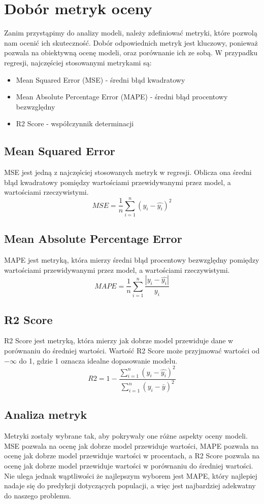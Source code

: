 \documentclass[11pt]{article}
\begin{document}
\section{Dobór metryk oceny}
Zanim przystąpimy do analizy modeli, należy zdefiniować metryki, które pozwolą nam ocenić ich skuteczność.
Dobór odpowiednich metryk jest kluczowy, ponieważ pozwala na obiektywną ocenę modeli, oraz porównanie ich ze sobą.
W przypadku regresji, najczęściej stosowanymi metrykami są:
\begin{itemize}
\item Mean Squared Error (MSE) - średni błąd kwadratowy
\item Mean Absolute Percentage Error (MAPE) - średni błąd procentowy bezwzględny
\item R2 Score - współczynnik determinacji
\end{itemize}
\subsection{Mean Squared Error}
MSE jest jedną z najczęściej stosowanych metryk w regresji. Oblicza ona średni błąd kwadratowy pomiędzy wartościami przewidywanymi przez model, a wartościami rzeczywistymi.
\begin{equation}
MSE = \frac{1}{n} \sum_{i=1}^{n} (y_i - \hat{y_i})^2
\end{equation}
\subsection{Mean Absolute Percentage Error}
MAPE jest metryką, która mierzy średni błąd procentowy bezwzględny pomiędzy wartościami przewidywanymi przez model, a wartościami rzeczywistymi.
\begin{equation}
MAPE = \frac{1}{n} \sum_{i=1}^{n} \frac{|y_i - \hat{y_i}|}{y_i}
\end{equation}
\subsection{R2 Score}
R2 Score jest metryką, która mierzy jak dobrze model przewiduje dane w porównaniu do średniej wartości. Wartość R2 Score może przyjmować wartości od $-\infty$
  do 1, gdzie 1 oznacza idealne dopasowanie modelu.
\begin{equation}
R2 = 1 - \frac{\sum_{i=1}^{n} (y_i - \hat{y_i})^2}{\sum_{i=1}^{n} (y_i - \bar{y})^2}
\end{equation}
\subsection{Analiza metryk}
Metryki zostały wybrane tak, aby pokrywały one różne aspekty oceny modeli. MSE pozwala na ocenę jak dobrze model przewiduje wartości, MAPE pozwala na ocenę jak dobrze model przewiduje wartości w procentach, a R2 Score pozwala na ocenę jak dobrze model przewiduje wartości w porównaniu do średniej wartości.
Nie ulega jednak wąptliwości że najlepszym wyborem jest MAPE, który najlepiej nadaje się do predykcji dotyczących populacji\cite{dop}, a więc jest najbardziej adekwatny do naszego problemu.
\end{document}
